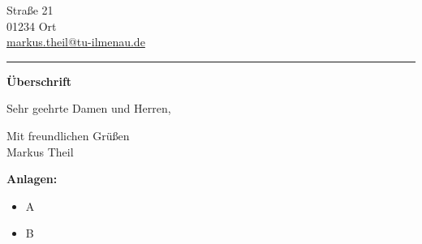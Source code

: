 \documentclass[paper=a4,
               fontsize=11pt,
               DIV=17]{scrartcl}
\begin{document}
\pagestyle{empty}
\begin{minipage}{0.6\textwidth}
\fontsize{43pt}{63pt}%
\selectfont{Markus Theil}
\end{minipage}
\hfill
\begin{minipage}{0.3\textwidth}
    \begin{flushright}
        \color{contactColor}
        \fontsize{11pt}{14pt}
        \selectfont%
        Straße 21\\
        01234 Ort\\
        \href{mailto:markus.theil@tu-ilmenau.de}{markus.theil@tu-ilmenau.de}
    \end{flushright}
\end{minipage}
\vspace{1ex}
\color{contactColor}%
\hrule
\vspace{1ex}
{
\sffamily
\Large
\textbf{Überschrift}
}

\vspace{1ex}

Sehr geehrte Damen und Herren,

\vspace{0.5ex}

\blindtext

\vspace{2em}
Mit freundlichen Grüßen\\[2ex]
Markus Theil

\vspace{3em}

\textbf{Anlagen:}
\begin{itemize}
	\item A
	\item B
\end{itemize}
\end{document}
